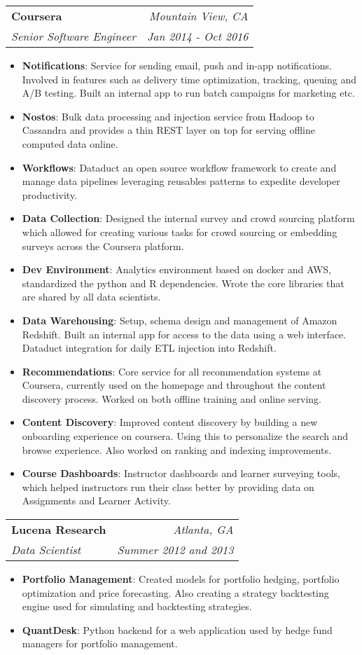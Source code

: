 \documentclass[letterpaper,11pt]{article}
\makeatletter
\newcommand{\resumeItem}[2]{
  \item\small{
    \textbf{#1}{: #2 \vspace{-2pt}}
  }
}
\newcommand{\resumeSubheading}[4]{
  \vspace{0pt}\item
    \begin{tabular*}{0.97\textwidth}[t]{l@{\extracolsep{\fill}}r}
      \textbf{#1} & \textit{\small#2} \\
      \textit{\small#3} & \textit{\small #4} \\
    \end{tabular*}\vspace{-5pt}
}
\newcommand{\resumeItemListStart}{\begin{itemize}[leftmargin=*]}
\newcommand{\resumeItemListEnd}{\end{itemize}\vspace{-5pt}}
\makeatother
\begin{document}
    \resumeSubheading
      {Coursera}{Mountain View, CA}
      {Senior Software Engineer}{Jan 2014 - Oct 2016}
      \resumeItemListStart
        \resumeItem{Notifications}
          {Service for sending email, push and in-app notifications. Involved in features such as delivery time optimization, tracking, queuing and A/B testing. Built an internal app to run batch campaigns for marketing etc.}
        \resumeItem{Nostos}
          {Bulk data processing and injection service from Hadoop to Cassandra and provides a thin REST layer on top for serving offline computed data online.}
        \resumeItem{Workflows}
          {Dataduct an open source workflow framework to create and manage data pipelines leveraging reusables patterns to expedite developer productivity.}
        \resumeItem{Data Collection}
          {Designed the internal survey and crowd sourcing platform which allowed for creating various tasks for crowd sourcing or embedding surveys across the Coursera platform.}
        \resumeItem{Dev Environment}
          {Analytics environment based on docker and AWS, standardized the python and R dependencies. Wrote the core libraries that are shared by all data scientists.}
        \resumeItem{Data Warehousing}
          {Setup, schema design and management of Amazon Redshift. Built an internal app for access to the data using a web interface. Dataduct integration for daily ETL injection into Redshift.}
        \resumeItem{Recommendations}
          {Core service for all recommendation systems at Coursera, currently used on the homepage and throughout the content discovery process. Worked on both offline training and online serving.}
        \resumeItem{Content Discovery}
          {Improved content discovery by building a new onboarding experience on coursera. Using this to personalize the search and browse experience. Also worked on ranking and indexing improvements.}
        \resumeItem{Course Dashboards}
          {Instructor dashboards and learner surveying tools, which helped instructors run their class better by providing data on Assignments and Learner Activity.}
      \resumeItemListEnd

    \resumeSubheading
      {Lucena Research}{Atlanta, GA}
      {Data Scientist}{Summer 2012 and 2013}
      \resumeItemListStart
        \resumeItem{Portfolio Management}
          {Created models for portfolio hedging,  portfolio optimization and price forecasting. Also creating a strategy backtesting engine used for simulating and backtesting strategies.}
        \resumeItem{QuantDesk}
          {Python backend for a web application used by hedge fund managers for portfolio management.}
      \resumeItemListEnd
\end{document}
